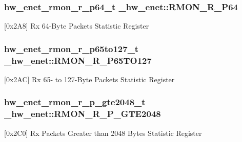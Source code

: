 \subsubsection[{\texorpdfstring{R\+M\+O\+N\+\_\+\+R\+\_\+\+P64}{RMON_R_P64}}]{ {\bf hw\+\_\+enet\+\_\+rmon\+\_\+r\+\_\+p64\+\_\+t} \+\_\+hw\+\_\+enet\+::\+R\+M\+O\+N\+\_\+\+R\+\_\+\+P64}\hypertarget{struct__hw__enet_a719582f3b4e18caba117faa9793112ba}{}\label{struct__hw__enet_a719582f3b4e18caba117faa9793112ba}
\mbox{[}0x2\+A8\mbox{]} Rx 64-\/\+Byte Packets Statistic Register 
\subsubsection[{\texorpdfstring{R\+M\+O\+N\+\_\+\+R\+\_\+\+P65\+T\+O127}{RMON_R_P65TO127}}]{ {\bf hw\+\_\+enet\+\_\+rmon\+\_\+r\+\_\+p65to127\+\_\+t} \+\_\+hw\+\_\+enet\+::\+R\+M\+O\+N\+\_\+\+R\+\_\+\+P65\+T\+O127}\hypertarget{struct__hw__enet_a94fefd092de0014101c112ba52ccaa0d}{}\label{struct__hw__enet_a94fefd092de0014101c112ba52ccaa0d}
\mbox{[}0x2\+AC\mbox{]} Rx 65-\/ to 127-\/\+Byte Packets Statistic Register 
\subsubsection[{\texorpdfstring{R\+M\+O\+N\+\_\+\+R\+\_\+\+P\+\_\+\+G\+T\+E2048}{RMON_R_P_GTE2048}}]{ {\bf hw\+\_\+enet\+\_\+rmon\+\_\+r\+\_\+p\+\_\+gte2048\+\_\+t} \+\_\+hw\+\_\+enet\+::\+R\+M\+O\+N\+\_\+\+R\+\_\+\+P\+\_\+\+G\+T\+E2048}\hypertarget{struct__hw__enet_a4e09306c0ee1ab4050e2091d1f6e4e51}{}\label{struct__hw__enet_a4e09306c0ee1ab4050e2091d1f6e4e51}
\mbox{[}0x2\+C0\mbox{]} Rx Packets Greater than 2048 Bytes Statistic Register 
